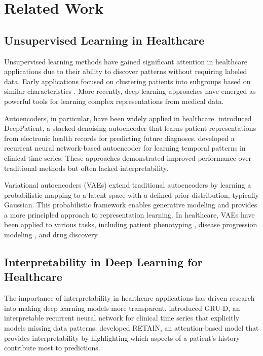 \documentclass[oupdraft]{bio}
\begin{document}
\section{Related Work}
\label{sec2}

\subsection{Unsupervised Learning in Healthcare}

Unsupervised learning methods have gained significant attention in healthcare applications due to their ability to discover patterns without requiring labeled data. Early applications focused on clustering patients into subgroups based on similar characteristics \citep{Ayala2006}. More recently, deep learning approaches have emerged as powerful tools for learning complex representations from medical data.

Autoencoders, in particular, have been widely applied in healthcare. \citet{Miotto2017} introduced DeepPatient, a stacked denoising autoencoder that learns patient representations from electronic health records for predicting future diagnoses. \citet{Choi2016} developed a recurrent neural network-based autoencoder for learning temporal patterns in clinical time series. These approaches demonstrated improved performance over traditional methods but often lacked interpretability.

Variational autoencoders (VAEs) \citep{Kingma2014} extend traditional autoencoders by learning a probabilistic mapping to a latent space with a defined prior distribution, typically Gaussian. This probabilistic framework enables generative modeling and provides a more principled approach to representation learning. In healthcare, VAEs have been applied to various tasks, including patient phenotyping \citep{Banda2018}, disease progression modeling \citep{Wang2019}, and drug discovery \citep{Gomez2018}.

\subsection{Interpretability in Deep Learning for Healthcare}

The importance of interpretability in healthcare applications has driven research into making deep learning models more transparent. \citet{Che2015} introduced GRU-D, an interpretable recurrent neural network for clinical time series that explicitly models missing data patterns. \citet{Choi2016b} developed RETAIN, an attention-based model that provides interpretability by highlighting which aspects of a patient's history contribute most to predictions.
\end{document}

